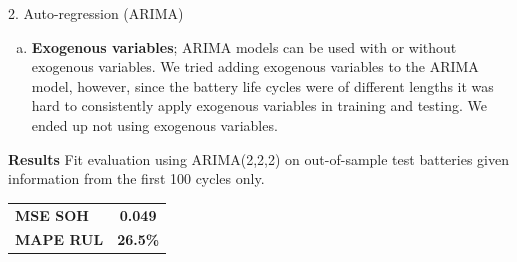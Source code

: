 \documentclass[final]{beamer}
\newlength{\colwidth}
\begin{document}
\begin{frame}[t]
\begin{columns}[t]
\begin{column}{\colwidth}
\begin{block}{2. Auto-regression (ARIMA)}
\begin{enumerate}[(a)]
      \item \textbf{Exogenous variables}; ARIMA models can be used with or without exogenous variables. We tried adding exogenous variables to the ARIMA model, however, since the battery life cycles were of different lengths it was hard to consistently apply exogenous variables in training and testing. We ended up not using exogenous variables. 
    \end{enumerate}

    \begin{minipage}[t]{0.65\textwidth}
    \textbf{Results} Fit evaluation using ARIMA(2,2,2) on out-of-sample test batteries given information from the first 100 cycles only.    
    \end{minipage}
    \begin{minipage}[t]{0.30\textwidth}
    \begin{flushright}
    \begin{tabular}{ l c }
       \textbf{MSE SOH} &  \textbf{0.049} \\
       \textbf{MAPE RUL} &  \textbf{26.5\%}
    \end{tabular}
    \end{flushright}
    \end{minipage}
      

\end{block}
\end{column}
\end{columns}
\end{frame}
\end{document}
